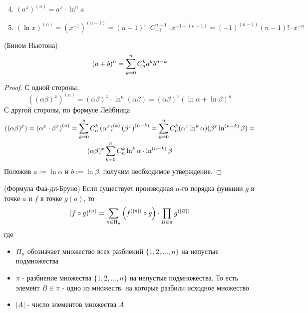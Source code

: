 \begin{enumerate}
\setcounter{enumi}{3}
	\item $(a^x)^{(n)} = a^x \cdot \ln^n a$
	\item $(\ln x)^{(n)} = (x^{-1})^{(n - 1)} = (n - 1)! \cdot C_{-1}^{n - 1} \cdot x^{-1 - (n - 1)} = (-1)^{(n - 1)} (n - 1)! \cdot x^{-n}$
\end{enumerate}

\begin{corollary} (Бином Ньютона)
	\[
	(a + b)^n = \sum\limits_{k = 0}^n C_n^k a^k b^{n - k}
	\]
\end{corollary}

\begin{proof}
	С одной стороны,
	\[
	\left((\alpha\beta)^x\right)^{(n)} = (\alpha\beta)^x \cdot \ln^n (\alpha\beta) = (\alpha\beta)^x(\ln \alpha + \ln \beta)^n
	\]
	С другой стороны, по формуле Лейбница
	\begin{multline*}
	\left((\alpha\beta)^x\right) = \left(\alpha^x \cdot \beta^x\right)^{(n)} = \sum\limits_{k = 0}^n C_n^k \left(\alpha^x\right)^{(k)}\left(\beta^x\right)^{(n - k)} = \sum\limits_{k = 0}^n C_n^k (\alpha^x \ln^k \alpha)(\beta^x \ln^{(n - k)} \beta) = \\
	(\alpha\beta)^x \sum\limits_{k = 0}^n C_n^k \ln^k \alpha \cdot \ln^{(n - k)} \beta
	\end{multline*}
	Положив $a := \ln \alpha$ и $b := \ln \beta$, получим необходимое утверждение.
\end{proof}

\begin{theorem} (Формула Фаа-ди-Бруно)
	Если существует производная $n$-го порядка функции $g$ в точке $a$ и $f$ в точке $g(a)$, то
	\[
		(f \circ g)^{(n)} = \sum\limits_{\pi \in \Pi_n} \left(f^{(|\pi|)} \circ g\right) \cdot \prod\limits_{B \in \pi} g^{(|B|)}
	\]
	где 
	\begin{itemize}
		\item $\Pi_n$ обозначает множество всех разбиений $\{1, 2, \dots, n\}$ на непустые подмножества
		
		\item $\pi$ - разбиение множества $\{1, 2, \ldots, n\}$ на непустые подмножества. То есть элемент $B \in \pi$ - одно из множеств, на которые разбили исходное множество
		
		\item $|A|$ - число элементов множества $A$
	\end{itemize}
\end{theorem}

